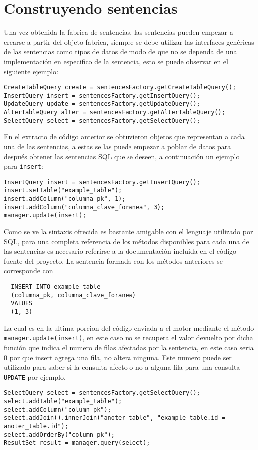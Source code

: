 \section{Construyendo sentencias}
%
%
Una vez obtenida la fabrica de sentencias, las sentencias pueden empezar a crearse a partir del objeto fabrica, siempre se debe utilizar las interfaces genéricas de las sentencias como tipos de datos de modo de que no se dependa de una implementación en especifico de la sentencia, esto se puede observar en el siguiente ejemplo:
%
\begin{lstlisting}[title=Uso de la fabrica de sentencias]
CreateTableQuery create = sentencesFactory.getCreateTableQuery();
InsertQuery insert = sentencesFactory.getInsertQuery();
UpdateQuery update = sentencesFactory.getUpdateQuery();
AlterTableQuery alter = sentencesFactory.getAlterTableQuery();
SelectQuery select = sentencesFactory.getSelectQuery();
\end{lstlisting}
%
En el extracto de código anterior se obtuvieron objetos que representan a cada una de las sentencias, a estas se las puede empezar a poblar de datos para después obtener las sentencias SQL que se deseen, a continuación un ejemplo para \verb=insert=:
%
\begin{lstlisting}[title=Uso de una sentencia INSERT]
InsertQuery insert = sentencesFactory.getInsertQuery();
insert.setTable("example_table");
insert.addColumn("columna_pk", 1);
insert.addColumn("columna_clave_foranea", 3);
manager.update(insert);
\end{lstlisting}
%
Como se ve la sintaxis ofrecida es bastante amigable con el lenguaje utilizado por SQL, para una completa referencia de los métodos disponibles para cada una de las sentencias es necesario referirse a la documentación incluida en el código fuente del proyecto. La sentencia formada con los métodos anteriores se corresponde con
\begin{Verbatim}
  INSERT INTO example_table 
  (columna_pk, columna_clave_foranea) 
  VALUES 
  (1, 3)
\end{Verbatim}
La cual es en la ultima porcion del código enviada a el motor mediante el método \verb=manager.update(insert)=, en este caso no se recupera el valor devuelto por dicha función que indica el numero de filas afectadas por la sentencia, en este caso seria $0$ por que insert agrega una fila, no altera ninguna. Este numero puede ser utilizado para saber si la consulta afecto o no a alguna fila para una consulta \verb=UPDATE= por ejemplo.
%
\begin{lstlisting}[title=Uso de una sentencia SELECT]
SelectQuery select = sentencesFactory.getSelectQuery();
select.addTable("example_table");
select.addColumn("column_pk");
select.addJoin().innerJoin("anoter_table", "example_table.id = anoter_table.id");
select.addOrderBy("column_pk");
ResultSet result = manager.query(select); 
\end{lstlisting}
